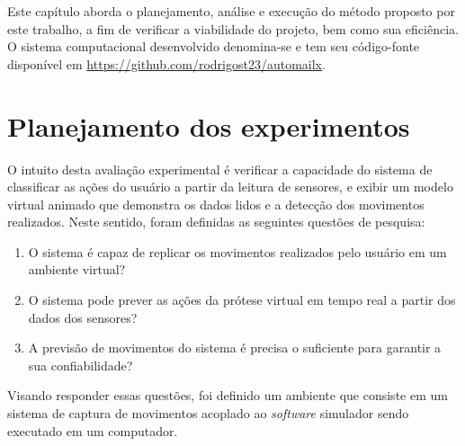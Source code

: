 Este capítulo aborda o planejamento, análise e execução do método proposto por este trabalho, a fim de verificar a viabilidade do projeto, bem como sua eficiência. O sistema computacional desenvolvido denomina-se \productname{} e tem seu código-fonte disponível em \url{https://github.com/rodrigost23/automailx}.

%
\section{Planejamento dos experimentos}\label{sec:result_planejamento}
%

O intuito desta avaliação experimental é verificar a capacidade do sistema \productname{} de classificar as ações do usuário a partir da leitura de sensores, e exibir um modelo virtual animado que demonstra os dados lidos e a detecção dos movimentos realizados. Neste sentido, foram definidas as seguintes questões de pesquisa:

\begin{enumerate}[label=\textbf{QP\arabic*:}, ref=QP\arabic*]
    \item O sistema \productname{} é capaz de replicar os movimentos realizados pelo usuário em um ambiente virtual?\label{qp:simula_movimentos}
    \item O sistema \productname{} pode prever as ações da prótese virtual em tempo real a partir dos dados dos sensores?\label{qp:previsao_sensores}
    \item A previsão de movimentos do sistema \productname{} é precisa o suficiente para garantir a sua confiabilidade?\label{qp:acuracia}
\end{enumerate}

Visando responder essas questões, foi definido um ambiente que consiste em um sistema de captura de movimentos acoplado ao \textit{software} simulador sendo executado em um computador.



